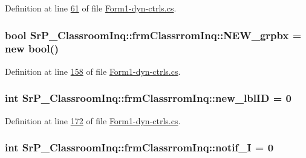 \-Definition at line \hyperlink{_form1-dyn-ctrls_8cs_source_l00061}{61} of file \hyperlink{_form1-dyn-ctrls_8cs_source}{\-Form1-\/dyn-\/ctrls.\-cs}.

\hypertarget{class_sr_p___classroom_inq_1_1frm_classrrom_inq_aaf5a152b29ae06c11e8e25f0eabf454d}{
\subsubsection[{\-N\-E\-W\-\_\-grpbx}]{\setlength{\rightskip}{0pt plus 5cm}bool {\bf \-Sr\-P\-\_\-\-Classroom\-Inq\-::frm\-Classrrom\-Inq\-::\-N\-E\-W\-\_\-grpbx} = new bool()}}
\label{class_sr_p___classroom_inq_1_1frm_classrrom_inq_aaf5a152b29ae06c11e8e25f0eabf454d}


\-Definition at line \hyperlink{_form1-dyn-ctrls_8cs_source_l00158}{158} of file \hyperlink{_form1-dyn-ctrls_8cs_source}{\-Form1-\/dyn-\/ctrls.\-cs}.

\hypertarget{class_sr_p___classroom_inq_1_1frm_classrrom_inq_a561cfd5c0d34d4adcb14aee4efc01643}{
\subsubsection[{new\-\_\-lbl\-I\-D}]{\setlength{\rightskip}{0pt plus 5cm}int {\bf \-Sr\-P\-\_\-\-Classroom\-Inq\-::frm\-Classrrom\-Inq\-::new\-\_\-lbl\-I\-D} = 0}}
\label{class_sr_p___classroom_inq_1_1frm_classrrom_inq_a561cfd5c0d34d4adcb14aee4efc01643}


\-Definition at line \hyperlink{_form1-dyn-ctrls_8cs_source_l00172}{172} of file \hyperlink{_form1-dyn-ctrls_8cs_source}{\-Form1-\/dyn-\/ctrls.\-cs}.

\hypertarget{class_sr_p___classroom_inq_1_1frm_classrrom_inq_a55f84efe1ba2cfb49d836798a1db3477}{
\subsubsection[{notif\-\_\-\-I}]{\setlength{\rightskip}{0pt plus 5cm}int {\bf \-Sr\-P\-\_\-\-Classroom\-Inq\-::frm\-Classrrom\-Inq\-::notif\-\_\-\-I} = 0}}
\label{class_sr_p___classroom_inq_1_1frm_classrrom_inq_a55f84efe1ba2cfb49d836798a1db3477}


